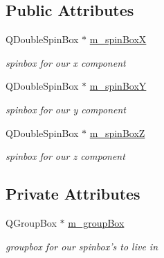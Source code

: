 \subsection*{Public Attributes}
\begin{DoxyCompactItemize}
\item 
\hypertarget{class_float_three_node_proxy_widget_af683535cdc97dd14e07fccc72a6466eb}{Q\-Double\-Spin\-Box $\ast$ \hyperlink{class_float_three_node_proxy_widget_af683535cdc97dd14e07fccc72a6466eb}{m\-\_\-spin\-Box\-X}}\label{class_float_three_node_proxy_widget_af683535cdc97dd14e07fccc72a6466eb}

\begin{DoxyCompactList}\small\item\em spinbox for our x component \end{DoxyCompactList}\item 
\hypertarget{class_float_three_node_proxy_widget_a972ce13076c540a1cc01ec8a69e5e725}{Q\-Double\-Spin\-Box $\ast$ \hyperlink{class_float_three_node_proxy_widget_a972ce13076c540a1cc01ec8a69e5e725}{m\-\_\-spin\-Box\-Y}}\label{class_float_three_node_proxy_widget_a972ce13076c540a1cc01ec8a69e5e725}

\begin{DoxyCompactList}\small\item\em spinbox for our y component \end{DoxyCompactList}\item 
\hypertarget{class_float_three_node_proxy_widget_a647eb0ec6918e85d8e2595025a834ad8}{Q\-Double\-Spin\-Box $\ast$ \hyperlink{class_float_three_node_proxy_widget_a647eb0ec6918e85d8e2595025a834ad8}{m\-\_\-spin\-Box\-Z}}\label{class_float_three_node_proxy_widget_a647eb0ec6918e85d8e2595025a834ad8}

\begin{DoxyCompactList}\small\item\em spinbox for our z component \end{DoxyCompactList}\end{DoxyCompactItemize}
\subsection*{Private Attributes}
\begin{DoxyCompactItemize}
\item 
\hypertarget{class_float_three_node_proxy_widget_a584837e3859b1fdadd453ae844d46948}{Q\-Group\-Box $\ast$ \hyperlink{class_float_three_node_proxy_widget_a584837e3859b1fdadd453ae844d46948}{m\-\_\-group\-Box}}\label{class_float_three_node_proxy_widget_a584837e3859b1fdadd453ae844d46948}

\begin{DoxyCompactList}\small\item\em groupbox for our spinbox's to live in \end{DoxyCompactList}\end{DoxyCompactItemize}
